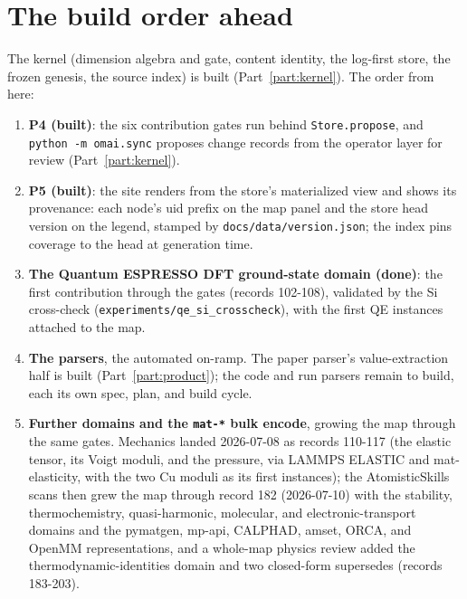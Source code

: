 \documentclass[11pt,a4paper]{article}
\begin{document}
\section{The build order ahead}
\label{sec:status-buildorder}

The kernel (dimension algebra and gate, content identity, the log-first store,
the frozen genesis, the source index) is built (Part~\ref{part:kernel}). The
order from here:

\begin{enumerate}[leftmargin=2em, itemsep=0.2em]
  \item \textbf{P4 (built)}: the six contribution gates run behind
        \texttt{Store.propose}, and \texttt{python -m omai.sync} proposes
        change records from the operator layer for review
        (Part~\ref{part:kernel}).
  \item \textbf{P5 (built)}: the site renders from the store's materialized
        view and shows its provenance: each node's uid prefix on the map panel
        and the store head version on the legend, stamped by
        \texttt{docs/data/version.json}; the index pins coverage to the head at
        generation time.
  \item \textbf{The Quantum ESPRESSO DFT ground-state domain (done)}: the first
        contribution through the gates (records 102-108), validated by the Si
        cross-check (\texttt{experiments/qe\_si\_crosscheck}), with the first QE
        instances attached to the map.
  \item \textbf{The parsers}, the automated on-ramp. The paper parser's
        value-extraction half is built (Part~\ref{part:product}); the code and run
        parsers remain to build, each its own spec, plan, and build cycle.
  \item \textbf{Further domains and the \texttt{mat-*} bulk encode}, growing the
        map through the same gates. Mechanics landed 2026-07-08 as records
        110-117 (the elastic tensor, its Voigt moduli, and the pressure, via
        LAMMPS ELASTIC and mat-elasticity, with the two Cu moduli as its first
        instances); the AtomisticSkills scans then grew the map through record 182
        (2026-07-10) with the stability, thermochemistry, quasi-harmonic,
        molecular, and electronic-transport domains and the pymatgen, mp-api,
        CALPHAD, amset, ORCA, and OpenMM representations, and a whole-map physics review
        added the thermodynamic-identities domain and two closed-form supersedes
        (records 183-203).
\end{enumerate}
\end{document}
